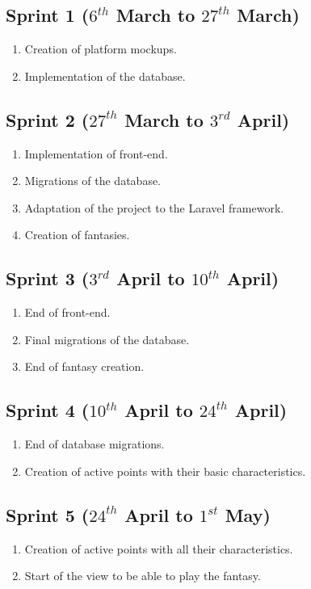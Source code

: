 \subsection{Sprint 1 ($6^{th}$ March to $27^{th}$ March)}
\begin{enumerate}
	\item Creation of platform mockups.
	\item Implementation of the database.
\end{enumerate}

\subsection{Sprint 2 ($27^{th}$ March to $3^{rd}$ April)}
\begin{enumerate}
	\item Implementation of front-end.
	\item Migrations of the database.
	\item Adaptation of the project to the Laravel framework.
	\item Creation of fantasies.
\end{enumerate}

\subsection{Sprint 3 ($3^{rd}$ April to $10^{th}$ April)}
\begin{enumerate}
	\item End of front-end.
	\item Final migrations of the database.
	\item End of fantasy creation.
\end{enumerate}

\subsection{Sprint 4 ($10^{th}$ April to $24^{th}$ April)}
\begin{enumerate}
	\item End of database migrations.
	\item Creation of active points with their basic characteristics.
\end{enumerate}

\subsection{Sprint 5 ($24^{th}$ April to $1^{st}$ May)}
\begin{enumerate}
	\item Creation of active points with all their characteristics.
	\item Start of the view to be able to play the fantasy.
\end{enumerate}


